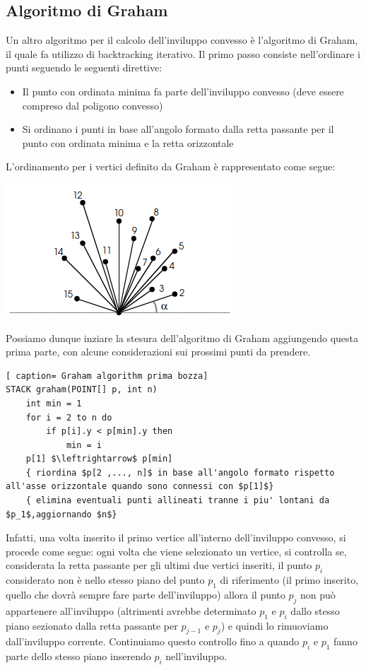 \documentclass[../cheatSheetAlgoritmi.tex]{subfiles}
\begin{document}
\subsection{Algoritmo di Graham}
Un altro algoritmo per il calcolo dell'inviluppo convesso è l'algoritmo di Graham, il quale fa utilizzo di backtracking iterativo.
Il primo passo consiste nell'ordinare i punti seguendo le seguenti direttive:
\begin{itemize}
	\item Il punto con ordinata minima fa parte dell'inviluppo convesso (deve essere compreso dal poligono convesso)
	\item Si ordinano i punti in base all'angolo formato dalla retta passante per il punto con ordinata minima e la retta orizzontale
\end{itemize}
L'ordinamento per i vertici definito da Graham è rappresentato come segue:
\begin{center}
	\includegraphics{../img/backtracking_inviluppo_convesso_graham_1}
\end{center}
Possiamo dunque inziare la stesura dell'algoritmo di Graham aggiungendo questa prima parte, con alcune considerazioni sui prossimi punti da prendere. 
 \begin{lstlisting}[ caption= Graham algorithm prima bozza]
STACK graham(POINT[] p, int n)
	int min = 1
	for i = 2 to n do
		if p[i].y < p[min].y then 
			min = i
	p[1] $\leftrightarrow$ p[min]
	{ riordina $p[2 ,..., n]$ in base all'angolo formato rispetto all'asse orizzontale quando sono connessi con $p[1]$}
	{ elimina eventuali punti allineati tranne i piu' lontani da $p_1$,aggiornando $n$}
\end{lstlisting}
Infatti, una volta inserito il primo vertice all'interno dell'inviluppo convesso, si procede come segue: ogni volta che viene selezionato un vertice, si controlla se, considerata la retta passante per gli ultimi due vertici inseriti, il punto $p_i$ considerato non è nello stesso piano del punto $p_1$ di riferimento (il primo inserito, quello che dovrà sempre fare parte dell'inviluppo) allora il punto $p_j$ non può appartenere all'inviluppo (altrimenti avrebbe determinato $p_1$ e $p_i$ dallo stesso piano sezionato dalla retta passante per $p_{j-1}$ e $p_j$) e quindi lo rimuoviamo dall'inviluppo corrente. Continuiamo questo controllo fino a quando $p_i$ e $p_1$ fanno parte dello stesso piano inserendo $p_i$ nell'inviluppo. \\
\end{document}
